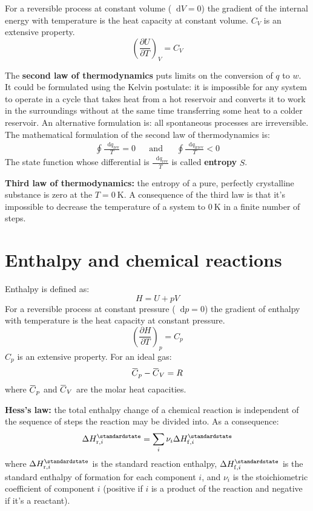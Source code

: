 \documentclass[12pt,a4paper]{report}
\newcommand*\diff{\mathop{}\!\mathrm{d}}
\newcommand{\overbar}[1]{\mkern 1.5mu\overline{\mkern-1.5mu#1\mkern-1.5mu}\mkern 1.5mu}
\begin{document}
    For a reversible process at constant volume ($\diff V=0$) the gradient of the internal energy with temperature is the heat capacity at constant volume. $C_{V}$ is an extensive property.
   \begin{equation*}
   \left(\frac{\partial U}{\partial T}\right)_{V}=C_{V}
   \end{equation*}  
   
   The \textbf{second law of thermodynamics} puts limits on the conversion of $q$ to $w$. It could be formulated using the Kelvin postulate: it is impossible for any system to operate in a cycle that takes heat from a hot reservoir and converts it to work in the surroundings without at the same time transferring some heat to a colder reservoir. An alternative formulation is: all spontaneous processes are irreversible.
   The mathematical formulation of the second law of thermodynamics is:
   \begin{align*}
   \oint\frac{\diff q_{\mathrm{rev}}}{T}=0 &&\mathrm{and}&& \oint\frac{\diff q_{\mathrm{irrev}}}{T}<0
   \end{align*}
   The state function whose differential is $\frac{\diff q_{\mathrm{rev}}}{T}$ is called \textbf{entropy} $S$.
   
   \textbf{Third law of thermodynamics:} the entropy of a pure, perfectly crystalline substance is zero at the $T=0\:\mathrm{K}$. A consequence of the third law is that it's impossible to decrease the temperature of a system to $0\:\mathrm{K}$ in a finite number of steps.
   \section*{Enthalpy and chemical reactions}
   Enthalpy is defined as:
   \begin{equation*}
   H=U+pV
   \end{equation*}
   For a reversible process at constant pressure ($\diff p=0$) the gradient of enthalpy with temperature is the heat capacity at constant pressure. 
   \begin{equation*}
   \left(\frac{\partial H}{\partial T}\right)_{p}=C_{p}
   \end{equation*}
   $C_{p}$ is an extensive property. 
   For an ideal gas:
   \begin{equation*}
   \overbar{C}_{p}-\overbar{C}_{V}=R
   \end{equation*}
   where $\overbar{C}_{p}$ and $\overbar{C}_{V}$ are the molar heat capacities.
   
   \textbf{Hess's law:} the total enthalpy change of a chemical reaction is independent of the sequence of steps the reaction may be divided into. As a consequence:
   \begin{equation*}
   \Delta H^{\standardstate}_{\mathrm{r}, i}=\sum\limits_{i}\nu_{i}\Delta H^{\standardstate}_{\mathrm{f},i}
   \end{equation*}
   where $\Delta H^{\standardstate}_{\mathrm{r}, i}$ is the standard reaction enthalpy, $\Delta H^{\standardstate}_{\mathrm{f},i}$ is the standard enthalpy of formation for each component $i$, and $\nu_{i}$ is the stoichiometric coefficient of component $i$ (positive if $i$ is a product of the reaction and negative if it's a reactant).
\end{document}
